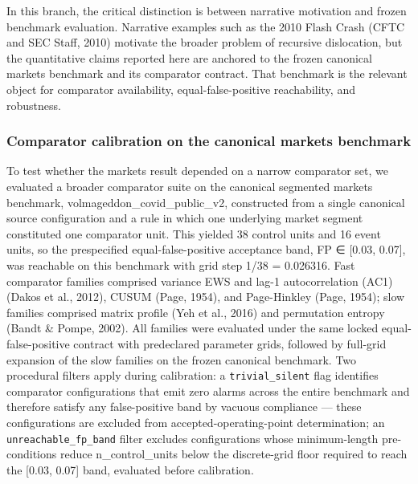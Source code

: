 \documentclass[
  11pt,
]{article}
\begin{document}
In this branch, the critical distinction is between narrative motivation
and frozen benchmark evaluation. Narrative examples such as the 2010
Flash Crash (CFTC and SEC Staff, 2010) motivate the broader problem of
recursive dislocation, but the quantitative claims reported here are
anchored to the frozen canonical markets benchmark and its comparator
contract. That benchmark is the relevant object for comparator
availability, equal-false-positive reachability, and robustness.

\subsubsection{Comparator calibration on the canonical markets
benchmark}\label{comparator-calibration-on-the-canonical-markets-benchmark}

To test whether the markets result depended on a narrow comparator set,
we evaluated a broader comparator suite on the canonical segmented
markets benchmark, volmageddon\_covid\_public\_v2, constructed from a
single canonical source configuration and a rule in which one underlying
market segment constituted one comparator unit. This yielded 38 control
units and 16 event units, so the prespecified equal-false-positive
acceptance band, FP ∈ {[}0.03, 0.07{]}, was reachable on this benchmark
with grid step 1/38 = 0.026316. Fast comparator families comprised
variance EWS and lag-1 autocorrelation (AC1) (Dakos et al., 2012), CUSUM
(Page, 1954), and Page-Hinkley (Page, 1954); slow families comprised
matrix profile (Yeh et al., 2016) and permutation entropy (Bandt \&
Pompe, 2002). All families were evaluated under the same locked
equal-false-positive contract with predeclared parameter grids, followed
by full-grid expansion of the slow families on the frozen canonical
benchmark. Two procedural filters apply during calibration: a
\texttt{trivial\_silent} flag identifies comparator configurations that
emit zero alarms across the entire benchmark and therefore satisfy any
false-positive band by vacuous compliance --- these configurations are
excluded from accepted-operating-point determination; an
\texttt{unreachable\_fp\_band} filter excludes configurations whose
minimum-length pre-conditions reduce n\_control\_units below the
discrete-grid floor required to reach the {[}0.03, 0.07{]} band,
evaluated before calibration.
\end{document}
